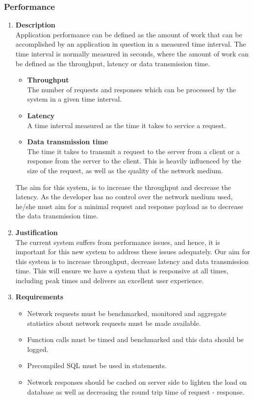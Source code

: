 \documentclass[a4paper,10pt]{article}
\begin{document}
\subsubsection{Performance}
\begin{enumerate}
\item \textbf{Description} \\
Application performance can be defined as the amount of work that can be accomplished by an application in question in a measured time interval. The time interval is normally measured in seconds, where the amount of work can be defined as the throughput, latency or data transmission time.
	\begin{itemize}
		\item \textbf{Throughput} \\
		The number of requests and responses which can be processed by the system in a given time interval.
		\item \textbf{Latency} \\
		A time interval measured as the time it takes to service a request. 
		\item \textbf{Data transmission time} \\
		The time it takes to transmit a request to the server from a client or a response from the server to the client. This is heavily influenced by the size of the request, as well as the quality of the network medium.
	\end{itemize}
	
	The aim for this system, is to increase the throughput and decrease the latency. As the developer has no control over the network medium used, he/she must aim for a minimal request and response payload as to decrease the data transmission time.
\item \textbf{Justification} \\
The current system suffers from performance issues, and hence, it is important for this new system to address these issues adequately. Our aim for this system is to increase throughput, decrease latency and data transmission time. This will ensure we have a system that is responsive at all times, including peak times and delivers an excellent user experience.
\item \textbf{Requirements}
	\begin{itemize}
		\item Network requests must be benchmarked, monitored and aggregate statistics about network requests must be made available.
		\item Function calls must be timed and benchmarked and this data should be logged.
		\item Precompiled SQL must be used in statements.
		\item Network responses should be cached on server side to lighten the load on database as well as decreasing the round trip time of request - response.
		\end{itemize}
\end{enumerate}
\end{document}
